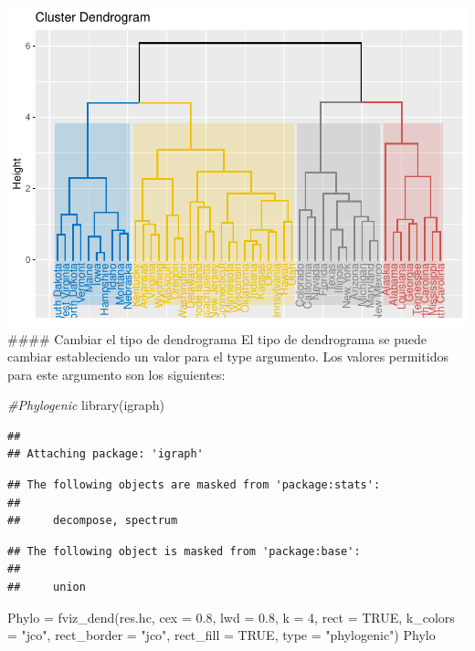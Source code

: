 \documentclass[
]{article}
\newenvironment{Shaded}{\begin{snugshade}}{\end{snugshade}}
\newcommand{\AttributeTok}[1]{\textcolor[rgb]{0.77,0.63,0.00}{#1}}
\newcommand{\CommentTok}[1]{\textcolor[rgb]{0.56,0.35,0.01}{\textit{#1}}}
\newcommand{\ConstantTok}[1]{\textcolor[rgb]{0.00,0.00,0.00}{#1}}
\newcommand{\DecValTok}[1]{\textcolor[rgb]{0.00,0.00,0.81}{#1}}
\newcommand{\FloatTok}[1]{\textcolor[rgb]{0.00,0.00,0.81}{#1}}
\newcommand{\FunctionTok}[1]{\textcolor[rgb]{0.00,0.00,0.00}{#1}}
\newcommand{\NormalTok}[1]{#1}
\newcommand{\OtherTok}[1]{\textcolor[rgb]{0.56,0.35,0.01}{#1}}
\newcommand{\StringTok}[1]{\textcolor[rgb]{0.31,0.60,0.02}{#1}}
\begin{document}
\includegraphics{clusterjerarquico1_files/figure-latex/unnamed-chunk-13-1.pdf}
\#\#\#\# Cambiar el tipo de dendrograma El tipo de dendrograma se puede
cambiar estableciendo un valor para el type argumento. Los valores
permitidos para este argumento son los siguientes:

\begin{Shaded}
\begin{Highlighting}[]
\CommentTok{\#Phylogenic}
\FunctionTok{library}\NormalTok{(igraph)}
\end{Highlighting}
\end{Shaded}

\begin{verbatim}
## 
## Attaching package: 'igraph'
\end{verbatim}

\begin{verbatim}
## The following objects are masked from 'package:stats':
## 
##     decompose, spectrum
\end{verbatim}

\begin{verbatim}
## The following object is masked from 'package:base':
## 
##     union
\end{verbatim}

\begin{Shaded}
\begin{Highlighting}[]
\NormalTok{Phylo }\OtherTok{=} \FunctionTok{fviz\_dend}\NormalTok{(res.hc, }\AttributeTok{cex =} \FloatTok{0.8}\NormalTok{, }\AttributeTok{lwd =} \FloatTok{0.8}\NormalTok{, }\AttributeTok{k =} \DecValTok{4}\NormalTok{,}
                  \AttributeTok{rect =} \ConstantTok{TRUE}\NormalTok{,}
                  \AttributeTok{k\_colors =} \StringTok{"jco"}\NormalTok{,}
                  \AttributeTok{rect\_border =} \StringTok{"jco"}\NormalTok{,}
                  \AttributeTok{rect\_fill =} \ConstantTok{TRUE}\NormalTok{,}
                  \AttributeTok{type =} \StringTok{"phylogenic"}\NormalTok{)}
\NormalTok{Phylo}
\end{Highlighting}
\end{Shaded}
\end{document}
